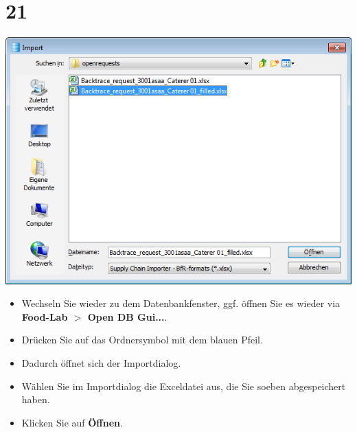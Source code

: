 \documentclass{beamer}
\begin{document}
\section{21}
\begin{frame}
	\begin{center}
  		\includegraphics[height=0.6\textheight]{21.png}
	\end{center}
	\begin{itemize}
		\item Wechseln Sie wieder zu dem Datenbankfenster, ggf. öffnen Sie es wieder via \textbf{Food-Lab $>$ Open DB Gui...}.
		\item Drücken Sie auf das Ordnersymbol mit dem blauen Pfeil.
		\item Dadurch öffnet sich der Importdialog.
		\item Wählen Sie im Importdialog die Exceldatei aus, die Sie soeben abgespeichert haben.
		\item Klicken Sie auf \textbf{Öffnen}.
	\end{itemize}
\end{frame}
\end{document}
